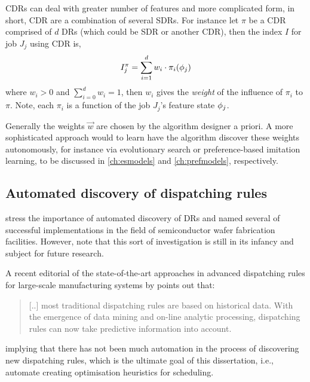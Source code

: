 CDRs can deal with greater number of features and more complicated form, in 
short, CDR are a combination of several SDRs. For instance let $\pi$ be a CDR 
comprised of $d$ DRs (which could be SDR or another CDR), then the index $I$ 
for job $J_j$ using CDR is, 
\begin{equation}
	I_j^{\pi} = \sum_{i=1}^d w_i \cdot \pi_i({\mathbf{\phi}}_j)
\end{equation}
where $w_i>0$ and $\sum_{i=0}^d w_i = 1$, then $w_i$ gives the \emph{weight} of 
the influence of $\pi_i$ to $\pi$. Note, 
each $\pi_i$ is a function of the job $J_j$'s feature state ${\mathbf{\phi}}_j$.

Generally the weights $\vec{w}$ are chosen by the algorithm designer a priori. 
A more sophisticated approach would to learn have the algorithm discover these 
weights autonomously, for instance via evolutionary search or preference-based 
imitation learning, to be discussed in \cref{ch:esmodels} and 
\cref{ch:prefmodels}, respectively.

\subsection*{Automated discovery of dispatching rules}
\citet{Monch13} stress the importance of automated discovery of DRs and named several of successful implementations in the field of semiconductor wafer fabrication facilities. 
However, \citeauthor{Monch13} note that this sort of investigation is still in its infancy and subject for future research.

A recent editorial of the state-of-the-art approaches in advanced dispatching rules for large-scale manufacturing systems by \citet{Chen13} points out that:
\begin{quote}
	[..] most traditional dispatching rules are based on historical data. With the emergence of data mining and on-line analytic processing, dispatching rules can now take predictive information into account.
\end{quote}
implying that there has not been much automation in the process of discovering new dispatching rules, which is the ultimate goal of this dissertation, i.e., automate creating optimisation heuristics for scheduling. 

